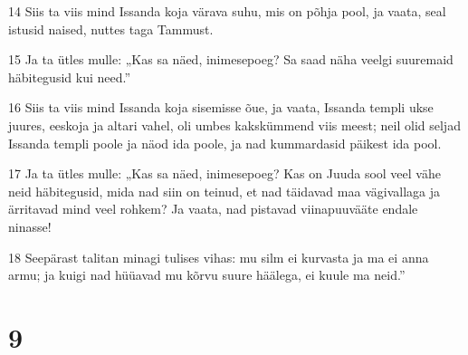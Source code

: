 \par 14 Siis ta viis mind Issanda koja värava suhu, mis on põhja pool, ja vaata, seal istusid naised, nuttes taga Tammust.
\par 15 Ja ta ütles mulle: „Kas sa näed, inimesepoeg? Sa saad näha veelgi suuremaid häbitegusid kui need.”
\par 16 Siis ta viis mind Issanda koja sisemisse õue, ja vaata, Issanda templi ukse juures, eeskoja ja altari vahel, oli umbes kakskümmend viis meest; neil olid seljad Issanda templi poole ja näod ida poole, ja nad kummardasid päikest ida pool.
\par 17 Ja ta ütles mulle: „Kas sa näed, inimesepoeg? Kas on Juuda sool veel vähe neid häbitegusid, mida nad siin on teinud, et nad täidavad maa vägivallaga ja ärritavad mind veel rohkem? Ja vaata, nad pistavad viinapuuvääte endale ninasse!
\par 18 Seepärast talitan minagi tulises vihas: mu silm ei kurvasta ja ma ei anna armu; ja kuigi nad hüüavad mu kõrvu suure häälega, ei kuule ma neid.”

\chapter{9}

